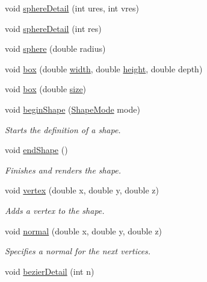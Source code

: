 \begin{DoxyCompactItemize}
\item 
void \hyperlink{namespacecprocessing_a21596477875fca056596a315117f9913}{sphere\-Detail} (int ures, int vres)
\item 
void \hyperlink{namespacecprocessing_a2a78420636e3fcd21e96f87be4b74316}{sphere\-Detail} (int res)
\item 
void \hyperlink{namespacecprocessing_ad12fe2bf0a14c6759624d8f6b66f5bd0}{sphere} (double radius)
\item 
void \hyperlink{namespacecprocessing_a28f122c44889d93bb070076ff6aaab9d}{box} (double \hyperlink{namespacecprocessing_a7af937eb8772235def57fcadd10fc82a}{width}, double \hyperlink{namespacecprocessing_ac392753eef02e2ad4ad84f5a076919be}{height}, double depth)
\item 
void \hyperlink{namespacecprocessing_acf30698a684da4beb34cee1ddbf37e60}{box} (double \hyperlink{namespacecprocessing_a4bbf578baacdd32fea5fab20517028ce}{size})
\item 
void \hyperlink{namespacecprocessing_afac44ac31031e9f27d12973e074230ff}{begin\-Shape} (\hyperlink{namespacecprocessing_a03538783321a3683ed8660f8bb23cd0c}{\-Shape\-Mode} mode)
\begin{DoxyCompactList}\small\item\em \-Starts the definition of a shape. \end{DoxyCompactList}\item 
void \hyperlink{namespacecprocessing_a1f0b4b628bd9d68c9321327a6ac7daf5}{end\-Shape} ()
\begin{DoxyCompactList}\small\item\em \-Finishes and renders the shape. \end{DoxyCompactList}\item 
void \hyperlink{namespacecprocessing_a790d9b7ae403d8cba72ae1c2f84f2fa7}{vertex} (double x, double y, double z)
\begin{DoxyCompactList}\small\item\em \-Adds a vertex to the shape. \end{DoxyCompactList}\item 
void \hyperlink{namespacecprocessing_a6d6f091f69de94483718a2a27d78f233}{normal} (double x, double y, double z)
\begin{DoxyCompactList}\small\item\em \-Specifies a normal for the next vertices. \end{DoxyCompactList}\item 
void \hyperlink{namespacecprocessing_aab8885eae2719fac74c66473a6c49d33}{bezier\-Detail} (int n)

\end{DoxyCompactItemize}
